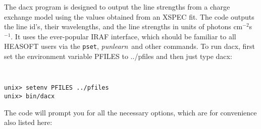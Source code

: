 \documentclass[11pt]{article}
\begin{document}
The dacx program is designed to output the line strengths from a
charge exchange model using the values obtained from an XSPEC fit.
The code outputs the line id's, their wavelengths, and the line
strengths in units of photons cm$^{-2}$s$^{-1}$.  It uses the
ever-popular IRAF interface, which should be familiar to all HEASOFT
users via the {\tt pset}, {\it punlearn}\ and other commands.  To run
dacx, first set the environment variable PFILES to ../pfiles and then
just type dacx:

{\tt
\begin{verbatim}
unix> setenv PFILES ../pfiles
unix> bin/dacx
\end{verbatim}
}

The code will prompt you for all the necessary options, which are for
convenience also listed here:
\end{document}
